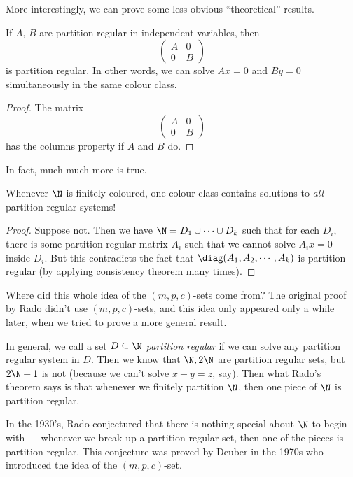 \documentclass[a4paper]{article}
\begin{document}
More interestingly, we can prove some less obvious ``theoretical'' results.

\begin{cor}
  If $A$, $B$ are partition regular in independent variables, then
  \[
    \begin{pmatrix}
      A & 0\\
      0 & B
    \end{pmatrix}
  \]
  is partition regular. In other words, we can solve $Ax = 0$ and $By = 0$ simultaneously in the same colour class.
\end{cor}

\begin{proof}
  The matrix
  \[
    \begin{pmatrix}
      A & 0\\
      0 & B
    \end{pmatrix}
   \]
   has the columns property if $A$ and $B$ do.
\end{proof}
In fact, much much more is true.

\begin{cor}
  Whenever $\N$ is finitely-coloured, one colour class contains solutions to \emph{all} partition regular systems!
\end{cor}

\begin{proof}
  Suppose not. Then we have $\N = D_1 \cup \cdots \cup D_k$ such that for each $D_i$, there is some partition regular matrix $A_i$ such that we cannot solve $A_i x = 0$ inside $D_i$. But this contradicts the fact that $\diag(A_1, A_2, \cdots, A_k)$ is partition regular (by applying consistency theorem many times).
\end{proof}

Where did this whole idea of the $(m, p, c)$-sets come from? The original proof by Rado didn't use $(m, p, c)$-sets, and this idea only appeared only a while later, when we tried to prove a more general result.

In general, we call a set $D \subseteq \N$ \emph{partition regular} if we can solve any partition regular system in $D$. Then we know that $\N, 2\N$ are partition regular sets, but $2\N + 1$ is not (because we can't solve $x + y = z$, say). Then what Rado's theorem says is that whenever we finitely partition $\N$, then one piece of $\N$ is partition regular.

In the 1930's, Rado conjectured that there is nothing special about $\N$ to begin with --- whenever we break up a partition regular set, then one of the pieces is partition regular. This conjecture was proved by Deuber in the 1970s who introduced the idea of the $(m, p, c)$-set.
\end{document}
